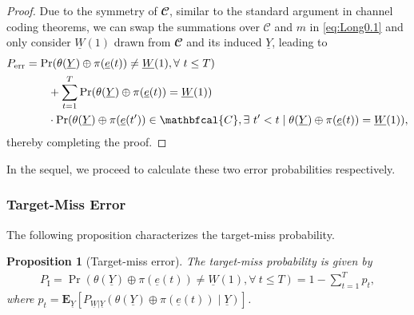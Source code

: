 \documentclass[letterpaper,draftclsnofoot,onecolumn]{IEEEtran}
\newtheorem{proposition}{Proposition}
\begin{document}
\begin{proof}
Due to the symmetry of $\mathbfcal{C}$, similar to the standard argument in channel coding theorems, we can swap the summations over $\mathcal{C}$ and $m$ in \eqref{eq:Long0.1} and only consider $\underline{W}(1)$ drawn from $\mathbfcal{C}$ and its induced $\underline{Y}$, leading to
\begin{align}
    P_{\text{err}} & = \Pr(\theta(\underline{Y})\oplus \pi(\underline{e}(t))\neq \underline{W}(1),\forall\ t\leq  T) \notag \\
    & \quad \quad + \sum_{t=1}^{T}\Pr(\theta(\underline{Y})\oplus \pi(\underline{e}(t)) = \underline{W}(1)) \notag \\
    & \quad \quad \cdot\Pr(\theta(\underline{Y})\oplus \pi(\underline{e}(t'))\in \mathbfcal{C},\exists\ t'< t \mid \theta(\underline{Y})\oplus \pi(\underline{e}(t))=\underline{W}(1)), \label{eq:Long0.5}
\end{align}
thereby completing the proof.
\end{proof}

In the sequel, we proceed to calculate these two error probabilities respectively.

\subsubsection{Target-Miss Error}\label{SubSub:first_item}
The following proposition characterizes the target-miss probability.

\begin{proposition}[Target-miss error]\label{prop:search_problem}
    The target-miss probability is given by
    \begin{align}
        P_{\text{I}} = \Pr(\theta(\underline{Y})\oplus \pi(\underline{e}(t))\neq \underline{W}(1),\forall\ t \leq T) = 1 - \sum_{t=1}^{T} p_t, \label{eq:first_err}
    \end{align}
    where $p_t = \mathbf{E}_{\underline{Y}}\left[P_{\underline{W}|\underline{Y}}(\theta(\underline{Y})\oplus \pi(\underline{e}(t)) \mid \underline{Y})\right]$.
\end{proposition}
\end{document}

